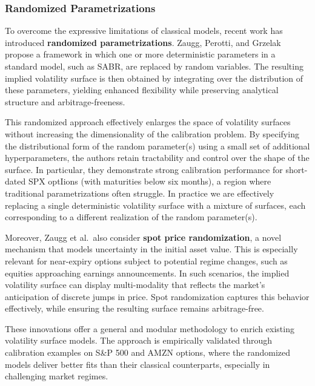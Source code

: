 \subsubsection{Randomized Parametrizations}

To overcome the expressive limitations of classical models, recent work has introduced \textbf{randomized parametrizations}.
Zaugg, Perotti, and Grzelak~\cite{zaugg2024volatility} propose a framework in which one or more deterministic parameters in a standard model, such as SABR, are replaced by random variables.
The resulting implied volatility surface is then obtained by integrating over the distribution of these parameters, yielding enhanced flexibility while preserving analytical structure and arbitrage-freeness.

This randomized approach effectively enlarges the space of volatility surfaces without increasing the dimensionality of the calibration problem.
By specifying the distributional form of the random parameter(s) using a small set of additional hyperparameters, the authors retain tractability and control over the shape of the surface.
In particular, they demonstrate strong calibration performance for short-dated SPX optIions (with maturities below six months), a region where traditional parametrizations often struggle.
In practice we are effectively replacing a single deterministic volatility surface with a mixture of surfaces, each corresponding to a different realization of the random parameter(s).

Moreover, Zaugg et al.\ also consider \textbf{spot price randomization}, a novel mechanism that models uncertainty in the initial asset value.
This is especially relevant for near-expiry options subject to potential regime changes, such as equities approaching earnings announcements.
In such scenarios, the implied volatility surface can display multi-modality that reflects the market's anticipation of discrete jumps in price.
Spot randomization captures this behavior effectively, while ensuring the resulting surface remains arbitrage-free.

These innovations offer a general and modular methodology to enrich existing volatility surface models.
The approach is empirically validated through calibration examples on S\&P 500 and AMZN options, where the randomized models deliver better fits than their classical counterparts, especially in challenging market regimes.

